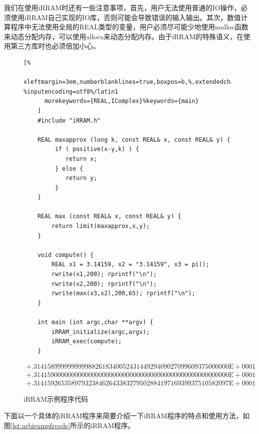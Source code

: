 我们在使用iRRAM时还有一些注意事项，首先，用户无法使用普通的IO操作，必须使用iRRAM自己实现的IO库，否则可能会导致错误的输入输出。其次，数值计算程序中无法使用全局的REAL类型的变量，用户必须尽可能少地使用malloc函数来动态分配内存，可以使用alloca来动态分配内存。由于iRRAM的特殊语义，在使用第三方库时也必须倍加小心。

\begin{figure}[h]
    \begin{lstlisting}[%
      xleftmargin=3em,numberblanklines=true,boxpos=b,%,extendedchars=\true, %inputencoding=utf8%/latin1
      morekeywords={REAL,IComplex}%keywords={main}
    ]
    #include "iRRAM.h"

    REAL maxapprox (long k, const REAL& x, const REAL& y) {
         if ( positive(x-y,k) ) {
            return x; 
         } else {
            return y; 
         }
    }

    REAL max (const REAL& x, const REAL& y) { 
        return limit(maxapprox,x,y);
    }

    void compute() {   
        REAL x1 = 3.14159, x2 = "3.14159", x3 = pi();
        rwrite(x1,200); rprintf("\n"); 
        rwrite(x2,200); rprintf("\n"); 
        rwrite(max(x3,x2),200,65); rprintf("\n"); 
    }

    int main (int argc,char **argv) { 
        iRRAM_initialize(argc,argv); 
        iRRAM_exec(compute); 
    }
    \end{lstlisting}
    \begin{align*}
        +.314158999999999988261834005243144929409027099609375000000\text{E}+0001 \\
        +.314159000000000000000000000000000000000000000000000000000\text{E}+0001 \\
        +.314159265358979323846264338327950288419716939937510582097\text{E}+0001
    \end{align*}

    \caption{iRRAM示例程序代码}
    \label{lst:irramexcode}
\end{figure}

下面以一个具体的iRRAM程序来简要介绍一下iRRAM程序的特点和使用方法，如图\ref{lst:arbiexmpfrcode}所示的iRRAM程序。


